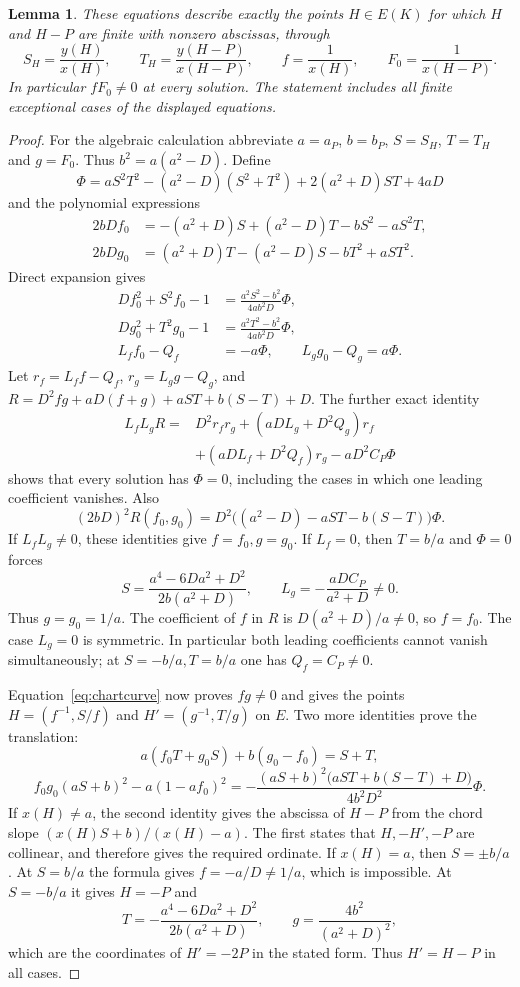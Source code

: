 \documentclass[11pt,a4paper]{article}
\newtheorem{lemma}[theorem]{Lemma}
\theoremstyle{remark}\newtheorem{remark}[theorem]{Remark}
\begin{document}
\begin{lemma}\label{lem:commonchart}
These equations describe exactly the points $H\in E(K)$ for which
$H$ and $H-P$ are finite with nonzero abscissas, through
\[
 S_H=\frac{y(H)}{x(H)},\qquad T_H=\frac{y(H-P)}{x(H-P)},\qquad
 f=\frac1{x(H)},\qquad F_0=\frac1{x(H-P)}.
\]
In particular $fF_0\ne0$ at every solution. The statement includes
all finite exceptional cases of the displayed equations.
\end{lemma}
\begin{proof}
For the algebraic calculation abbreviate $a=a_P$, $b=b_P$, $S=S_H$, $T=T_H$
and $g=F_0$. Thus $b^2=a(a^2-D)$. Define
\[
 \Phi=aS^2T^2-(a^2-D)(S^2+T^2)+2(a^2+D)ST+4aD
\]
and the polynomial expressions
\begin{align*}
 2bDf_0&=-(a^2+D)S+(a^2-D)T-bS^2-aS^2T,\\
 2bDg_0&=(a^2+D)T-(a^2-D)S-bT^2+aST^2.
\end{align*}
Direct expansion gives
\begin{align}
 Df_0^2+S^2f_0-1
   &=\frac{a^2S^2-b^2}{4ab^2D}\Phi,\label{eq:chartcurve}\\
 Dg_0^2+T^2g_0-1
   &=\frac{a^2T^2-b^2}{4ab^2D}\Phi,\nonumber\\
 L_ff_0-Q_f&=-a\Phi,\qquad L_gg_0-Q_g=a\Phi.\nonumber
\end{align}
Let $r_f=L_ff-Q_f$, $r_g=L_gg-Q_g$, and
$R=D^2fg+aD(f+g)+aST+b(S-T)+D$. The further exact identity
\begin{equation}\label{eq:chartmaster}
\begin{split}
 L_fL_gR={}&D^2r_fr_g+(aDL_g+D^2Q_g)r_f\\
          &+(aDL_f+D^2Q_f)r_g-aD^2C_P\Phi
\end{split}
\end{equation}
shows that every solution has $\Phi=0$, including the cases in which
one leading coefficient vanishes. Also
\[
 (2bD)^2R(f_0,g_0)=
 D^2\bigl((a^2-D)-aST-b(S-T)\bigr)\Phi.
\]
If $L_fL_g\ne0$, these identities give $f=f_0,g=g_0$.
If $L_f=0$, then $T=b/a$ and $\Phi=0$ forces
\[
 S=\frac{a^4-6Da^2+D^2}{2b(a^2+D)},\qquad
 L_g=-\frac{aDC_P}{a^2+D}\ne0.
\]
Thus $g=g_0=1/a$. The coefficient of $f$ in $R$ is
$D(a^2+D)/a\ne0$, so $f=f_0$. The case $L_g=0$ is symmetric.
In particular both leading coefficients cannot vanish simultaneously;
at $S=-b/a,T=b/a$ one has $Q_f=C_P\ne0$.

Equation~\eqref{eq:chartcurve} now proves $fg\ne0$ and gives the
points $H=(f^{-1},S/f)$ and $H'=(g^{-1},T/g)$ on $E$.
Two more identities prove the translation:
\[
 a(f_0T+g_0S)+b(g_0-f_0)=S+T,
\]
\[
 f_0g_0(aS+b)^2-a(1-af_0)^2
 =-\frac{(aS+b)^2\bigl(aST+b(S-T)+D\bigr)}{4b^2D^2}\Phi.
\]
If $x(H)\ne a$, the second identity gives the abscissa of
$H-P$ from the chord slope $(x(H)S+b)/(x(H)-a)$.
The first states that $H,-H',-P$ are collinear, and therefore gives
the required ordinate. If $x(H)=a$, then $S=\pm b/a$.
At $S=b/a$ the formula gives $f=-a/D\ne1/a$, which is impossible.
At $S=-b/a$ it gives $H=-P$ and
\[
 T=-\frac{a^4-6Da^2+D^2}{2b(a^2+D)},\qquad
 g=\frac{4b^2}{(a^2+D)^2},
\]
which are the coordinates of $H'=-2P$ in the stated form.
Thus $H'=H-P$ in all cases.


\end{proof}
\end{document}
